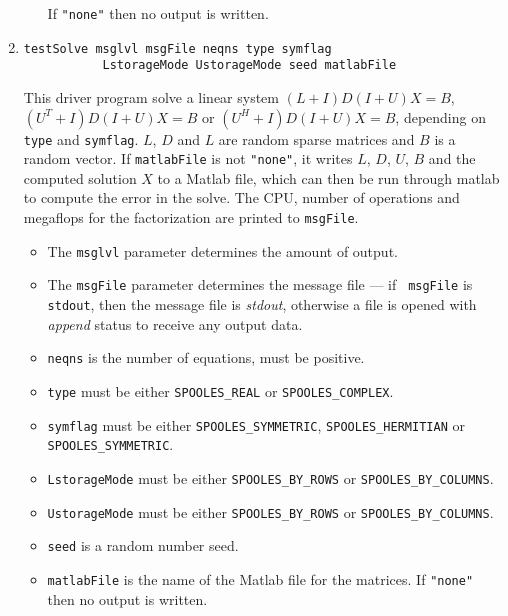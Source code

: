\begin{enumerate}
\begin{itemize}
If {\tt "none"} then no output is written.
\end{itemize}
\item
\begin{verbatim}
testSolve msglvl msgFile neqns type symflag 
           LstorageMode UstorageMode seed matlabFile
\end{verbatim}
This driver program solve a linear system
$(L+I)D(I+U)X = B$, 
$(U^T+I)D(I+U)X = B$ or
$(U^H+I)D(I+U)X = B$,
depending on {\tt type} and {\tt symflag}.
$L$, $D$ and $L$ are random sparse matrices and
$B$ is a random vector.
If {\tt matlabFile} is not {\tt "none"},
it writes $L$, $D$, $U$, $B$ and the computed solution
$X$ to a Matlab file,
which can then be run through matlab to compute the error in
the solve.
The CPU, number of operations and megaflops for the factorization
are printed to {\tt msgFile}.
\par
\begin{itemize}
\item
The {\tt msglvl} parameter determines the amount of output.
\item
The {\tt msgFile} parameter determines the message file --- if {\tt
msgFile} is {\tt stdout}, then the message file is {\it stdout},
otherwise a file is opened with {\it append} status to receive any
output data.
\item
{\tt neqns} is the number of equations, must be positive.
\item
{\tt type} must be either 
{\tt SPOOLES\_REAL} or
{\tt SPOOLES\_COMPLEX}.
\item
{\tt symflag} must be either 
{\tt SPOOLES\_SYMMETRIC},
{\tt SPOOLES\_HERMITIAN} or
{\tt SPOOLES\_SYMMETRIC}.
\item
{\tt LstorageMode} must be either 
{\tt SPOOLES\_BY\_ROWS} or
{\tt SPOOLES\_BY\_COLUMNS}.
\item
{\tt UstorageMode} must be either 
{\tt SPOOLES\_BY\_ROWS} or
{\tt SPOOLES\_BY\_COLUMNS}.
\item
{\tt seed} is a random number seed.
\item
{\tt matlabFile} is the name of the Matlab file for the matrices. 
If {\tt "none"} then no output is written.
\end{itemize}
\end{enumerate}
